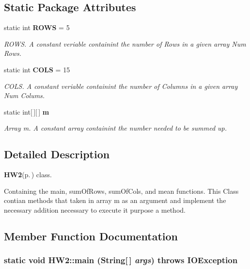 \subsection*{Static Package Attributes}
\begin{CompactItemize}
\item 
static int {\bf ROWS} = 5
\begin{CompactList}\small\item\em ROWS. A constant veriable containint the number of Rows in a given array Num Rows. \item\end{CompactList}\item 
static int {\bf COLS} = 15
\begin{CompactList}\small\item\em COLS. A constant veriable containint the number of Columns in a given array Num Colums. \item\end{CompactList}\item 
static int[$\,$][$\,$] {\bf m}
\begin{CompactList}\small\item\em Array m. A constant array containint the number needed to be summed up. \item\end{CompactList}\end{CompactItemize}


\subsection{Detailed Description}
{\bf HW2}{\rm (p.\,\pageref{class_h_w2})} class. 

Containing the main, sum\-Of\-Rows, sum\-Of\-Cols, and mean functions. This Class contian methods that taken in array m as an argument and implement the necessary addition necessary to execute it purpose a method. 



\subsection{Member Function Documentation}
\subsubsection{\setlength{\rightskip}{0pt plus 5cm}static void HW2::main (String[$\,$] {\em args})  throws IOException \hspace{0.3cm}{\tt  [inline, static]}}\label{class_h_w2_d9f1abb7da028579edd67a80d577caa9}


